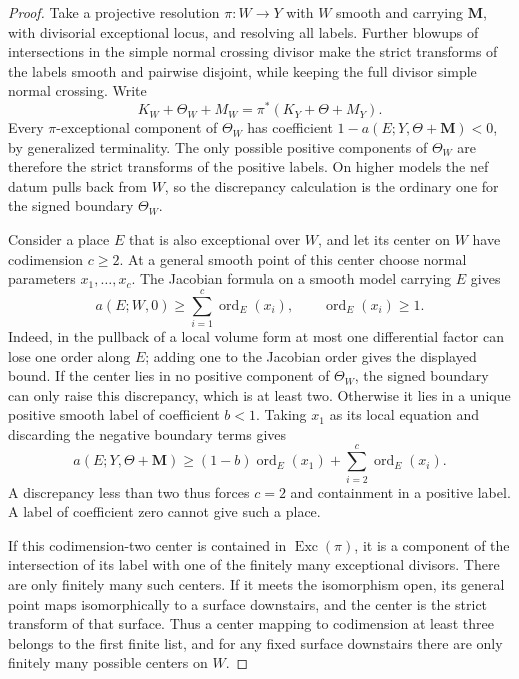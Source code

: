 \documentclass[11pt]{amsart}
\theoremstyle{definition}
\theoremstyle{remark}
\numberwithin{equation}{section}
\newcommand{\M}{\mathbf{M}}
\DeclareMathOperator{\Exc}{Exc}
\DeclareMathOperator{\ord}{ord}
\begin{document}
\begin{proof}
Take a projective resolution \(\pi:W\to Y\) with \(W\) smooth and carrying \(\M\),
with divisorial exceptional locus, and resolving all labels.  Further
blowups of intersections in the simple normal crossing divisor make the
strict transforms of the labels smooth and pairwise disjoint, while keeping
the full divisor simple normal crossing.  Write
\[
 K_W+\Theta_W+M_W=\pi^*(K_Y+\Theta+M_Y).
\]
Every \(\pi\)-exceptional component of \(\Theta_W\) has coefficient
\(1-a(E;Y,\Theta+\M)<0\), by generalized terminality.  The only possible
positive components of \(\Theta_W\) are therefore the strict transforms
of the positive labels.  On higher models the nef datum pulls back from \(W\), so the
discrepancy calculation is the ordinary one for the signed boundary
\(\Theta_W\).

Consider a place \(E\) that is also exceptional over \(W\), and let its
center on \(W\) have codimension \(c\geq2\).  At a general smooth point
of this center choose normal parameters \(x_1,\ldots,x_c\).  The Jacobian
formula on a smooth model carrying \(E\) gives
\[
 a(E;W,0)\geq\sum_{i=1}^c\ord_E(x_i),
 \qquad \ord_E(x_i)\geq1.
\]
Indeed, in the pullback of a local volume form at most one differential
factor can lose one order along \(E\); adding one to the Jacobian order
gives the displayed bound.  If the center lies in no positive component of
\(\Theta_W\), the signed boundary can only raise this discrepancy, which
is at least two.  Otherwise it lies in a unique positive smooth label of
coefficient \(b<1\).  Taking \(x_1\) as its local equation and discarding
the negative boundary terms gives
\begin{equation}\label{eq:local-discrepancy-estimate}
 a(E;Y,\Theta+\M)
 \geq (1-b)\ord_E(x_1)+\sum_{i=2}^c\ord_E(x_i).
\end{equation}
A discrepancy less than two thus forces \(c=2\) and containment in a
positive label.  A label of coefficient zero cannot give such a place.

If this codimension-two center is contained in \(\Exc(\pi)\), it is a
component of the intersection of its label with one of the finitely many
exceptional divisors.  There are only finitely many such centers.  If it
meets the isomorphism open, its general point maps isomorphically to a
surface downstairs, and the center is the strict transform of that surface.
Thus a center mapping to codimension at least three belongs to the first
finite list, and for any fixed surface downstairs there are only finitely
many possible centers on \(W\).


\end{proof}
\end{document}
